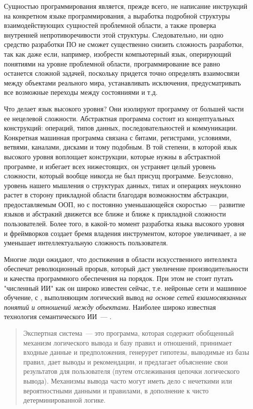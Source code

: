 
Сущностью программирования является, прежде всего, не написание инструкций на
конкретном языке программирования, а выработка подробной структуры
взаимодействующих сущностей проблемной области, а также проверка внутренней
непротиворечивости этой структуры.
Следовательно, ни одно средство разработки ПО не сможет существенно снизить
сложность разработки, так как даже если, например, изобрести компьютерный язык,
оперирующий понятиями на уровне проблемной области, программирование все равно
останется сложной задачей, поскольку придется точно определять взаимосвязи между
объектами реального мира, устанавливать исключения, предусматривать все
возможные переходы между состояниями и т.д.

Что делает язык высокого уровня? Они изолируют программу от большей части ее
нецелевой сложности. Абстрактная программа состоит из концептуальных
конструкций: операций, типов данных, последовательностей и коммуникации.
Конкретная машинная программа связана с битами, регистрами, условиями, ветвями,
каналами, дисками и тому подобным. В той степени, в которой язык высокого уровня
воплощает конструкции, которые нужны в абстрактной программе, и избегает всех
нижестоящих, он устраняет целый уровень сложности, который вообще никогда не был
присущ программе. Безусловно, уровень нашего мышления о структурах данных, типах
и операциях неуклонно растет в сторону прикладной области благодаря
возможностям абстракции, предоставляемым ООП, но с постоянно уменьшающейся
скоростью\ --- развитие языков и абстракий движется все ближе и ближе к
прикладной сложности пользователей. Более того, в какой-то момент разработка
языка высокого уровня и фреймворков создает бремя владения инструментом, которое
увеличивает, а не уменьшает интеллектуальную сложность пользователя.

Многие люди ожидают, что достижения в области искусственного интеллекта
обеспечат революционный прорыв, который даст увеличение производительности и
качества программного обеспечения на порядок. При этом не стоит путать
"численный ИИ" как он широко известен сейчас, т.е. нейроные сети и машинное
обучение, с , выполняющим логический вывод \emph{на
основе сетей взаимосвязанных понятий и отношений между объектами}. Наиболее
широко известная технология семантического ИИ\ --- .

\begin{quotation}\noindent
Экспертная система\ --- это программа, которая содержит обобщенный механизм
логического вывода и базу правил и отношений, принимает входные данные и
предположения, генерурет гипотезы, выводимые из базы правил, дает выводы и
рекомендации, и предлагает объяснение свои результатов для пользователя (путем
отслеживания цепочки логического вывода). Механизмы вывода часто могут иметь
дело с нечеткими или вероятностными данными и правилами, в дополнение к чисто
детерминированной логике.
\end{quotation}

